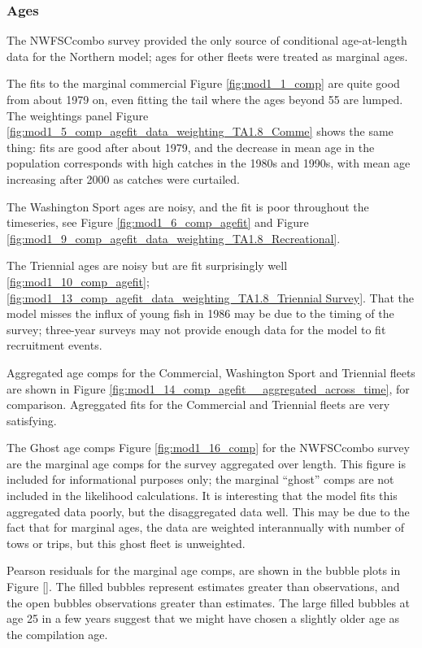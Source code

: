 \documentclass[12pt,]{article}
\begin{document}
\subsubsection{Ages}\label{ages}

The NWFSCcombo survey provided the only source of conditional
age-at-length data for the Northern model; ages for other fleets were
treated as marginal ages.

The fits to the marginal commercial Figure \ref{fig:mod1_1_comp} are
quite good from about 1979 on, even fitting the tail where the ages
beyond 55 are lumped. The weightings panel Figure
\ref{fig:mod1_5_comp_agefit_data_weighting_TA1.8_Comme} shows the same
thing: fits are good after about 1979, and the decrease in mean age in
the population corresponds with high catches in the 1980s and 1990s,
with mean age increasing after 2000 as catches were curtailed.

The Washington Sport ages are noisy, and the fit is poor throughout the
timeseries, see Figure \ref{fig:mod1_6_comp_agefit} and Figure
\ref{fig:mod1_9_comp_agefit_data_weighting_TA1.8_Recreational}.

The Triennial ages are noisy but are fit surprisingly well
\ref{fig:mod1_10_comp_agefit};
\ref{fig:mod1_13_comp_agefit_data_weighting_TA1.8_Triennial Survey}.
That the model misses the influx of young fish in 1986 may be due to the
timing of the survey; three-year surveys may not provide enough data for
the model to fit recruitment events.

Aggregated age comps for the Commercial, Washington Sport and Triennial
fleets are shown in Figure
\ref{fig:mod1_14_comp_agefit__aggregated_across_time}, for comparison.
Agreggated fits for the Commercial and Triennial fleets are very
satisfying.

The Ghost age comps Figure \ref{fig:mod1_16_comp} for the NWFSCcombo
survey are the marginal age comps for the survey aggregated over length.
This figure is included for informational purposes only; the marginal
``ghost'' comps are not included in the likelihood calculations. It is
interesting that the model fits this aggregated data poorly, but the
disaggregated data well. This may be due to the fact that for marginal
ages, the data are weighted interannually with number of tows or trips,
but this ghost fleet is unweighted.

Pearson residuals for the marginal age comps, are shown in the bubble
plots in Figure \ref{}. The filled bubbles represent estimates greater
than observations, and the open bubbles observations greater than
estimates. The large filled bubbles at age 25 in a few years suggest
that we might have chosen a slightly older age as the compilation age.
\end{document}
